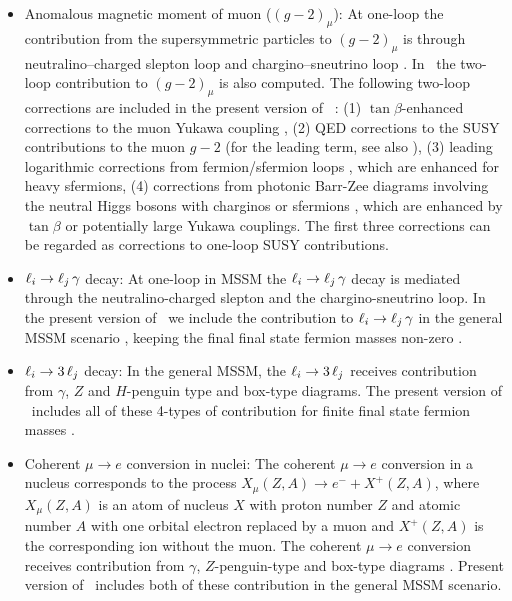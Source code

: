 \documentclass[preprint,3p,12pt]{elsarticle}
\begin{document}
{\begin{itemize}
	\item Anomalous magnetic moment of muon ($(g-2)_{\mu}$): At one-loop the contribution from the supersymmetric particles to $(g-2)_{\mu}$ is through neutralino--charged slepton loop and chargino--sneutrino loop \cite{Chattopadhyay:1995ae,Moroi:1995yh,Hisano:1995cp}. In \hf\ the two-loop contribution to $(g-2)_{\mu}$ is also computed. The following two-loop corrections  are included in the present version of \hf\ :
		(1) $\tan\beta$-enhanced corrections to the muon Yukawa coupling \cite{Marchetti:2008hw},
		(2) QED corrections to the SUSY contributions to the muon $g-2$ \cite{vonWeitershausen:2010zr} (for the leading term, see also \cite{Degrassi:1998es}),
		(3) leading logarithmic corrections from fermion/sfermion loops \cite{Fargnoli:2013zia}, which are enhanced for heavy sfermions,
		(4) corrections from photonic Barr-Zee diagrams involving the neutral Higgs bosons with charginos or sfermions \cite{Stockinger:2006zn}, which are enhanced by $\tan\beta$ or potentially large Yukawa couplings.
		The first three corrections can be regarded as corrections to one-loop SUSY contributions.
	\item $\ell_i \to \ell_j\, \gamma$ decay: At one-loop in MSSM the $\ell_i \to \ell_j\, \gamma$ decay is mediated through the neutralino-charged slepton and the chargino-sneutrino loop. In the present version of \hf\ we include the contribution to $\ell_i \to \ell_j\, \gamma$ in the general MSSM scenario \cite{Hisano:1995cp}, keeping the final final state fermion masses non-zero \cite{Arganda:2005ji}.
	\item $\ell_i \to 3\, \ell_j$ decay: In the general MSSM, the $\ell_i \to 3\, \ell_j$ receives contribution from $\gamma$, $Z$ and $H$-penguin type and box-type diagrams. The present version of \hf\ includes all of these 4-types of contribution for finite final state fermion masses \cite{Hisano:1995cp,Arganda:2005ji}. 
	\item Coherent $\mu \to e$ conversion in nuclei: The coherent $\mu \to e$ conversion in a nucleus corresponds to the process $X_{\mu}(Z,A) \to e^{-} + X^{+}(Z,A)$, where $X_{\mu}(Z,A)$ is an atom of nucleus $X$ with proton number $Z$ and atomic number $A$ with one orbital electron replaced by a muon and $X^{+}(Z,A)$ is the corresponding ion without the muon. The coherent $\mu \to e$ conversion receives contribution from $\gamma$, $Z$-penguin-type and box-type diagrams \cite{Hisano:1995cp}. Present version of \hf\ includes both of these contribution in the general MSSM scenario.  
\end{itemize}

}
\end{document}
